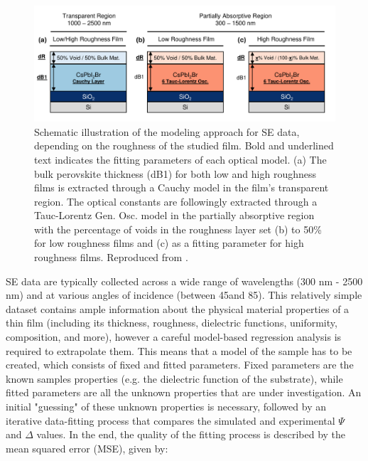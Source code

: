 \begin{figure}{}
  \centering
  \medskip
  \includegraphics[width=.95\textwidth]{chapters/ellipsometry/image/Model_Approach.pdf}
  \caption[Schematic illustration of the modeling approach for SE data, depending on the roughness of the studied film.]{Schematic illustration of the modeling approach for SE data, depending on the roughness of the studied film. Bold and underlined text indicates the fitting parameters of each optical model. (a) The bulk perovskite thickness (dB1) for both low and high roughness films is extracted through a Cauchy model in the film's transparent region. The optical constants are followingly extracted through a Tauc-Lorentz Gen. Osc. model in the partially absorptive region with the percentage of voids in the roughness layer set (b) to 50\% for low roughness films and (c) as a fitting parameter for high roughness films. Reproduced from \cite{Papadopoulou2024InEllipsometry}.}
  \label{fig:ellipsometry:static_models}
\end{figure}

SE data are typically collected across a wide range of wavelengths (300 nm - 2500 nm) and at various angles of incidence (between 45\degree and 85\degree). This relatively simple dataset contains ample information about the physical material properties of a thin film (including its thickness, roughness, dielectric functions, uniformity, composition, and more), however a careful model-based regression analysis is required to extrapolate them. This means that a model of the sample has to be created, which consists of fixed and fitted parameters. Fixed parameters are the known samples properties (e.g. the dielectric function of the substrate), while fitted parameters are all the unknown properties that are under investigation. An initial "guessing" of these unknown properties is necessary, followed by an iterative data-fitting process that compares the simulated and experimental $\Psi$ and $\Delta$ values. In the end, the quality of the fitting process is described by the mean squared error (MSE), given by: 


